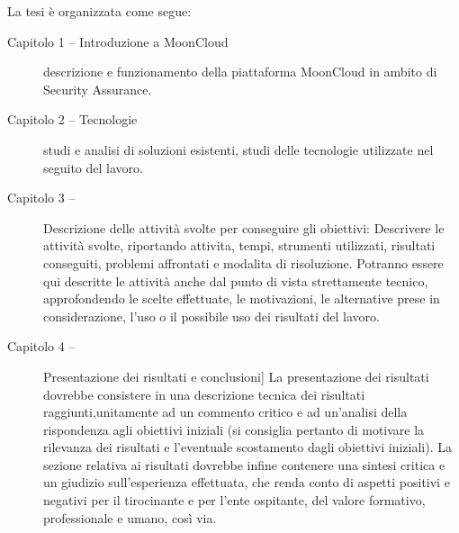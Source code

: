La tesi \`e organizzata come segue:
\begin{description}
    \item[Capitolo 1 -- Introduzione a MoonCloud] descrizione e funzionamento della piattaforma MoonCloud in ambito di Security Assurance. 
    \item[Capitolo 2 -- Tecnologie] studi e analisi di soluzioni esistenti, studi delle tecnologie utilizzate nel seguito del lavoro.
    \item[Capitolo 3 -- ] Descrizione delle attività svolte per conseguire gli obiettivi: Descrivere le attività svolte, 
    riportando attivita, tempi, strumenti utilizzati, risultati conseguiti, problemi affrontati e modalita di risoluzione. 
    Potranno essere qui descritte le attività anche dal punto di vista strettamente tecnico, approfondendo le scelte effettuate, 
    le motivazioni, le alternative prese in considerazione, l’uso o il possibile uso dei risultati del lavoro.
    \item[Capitolo 4 -- ] Presentazione dei risultati e conclusioni] La presentazione dei risultati dovrebbe consistere in una 
    descrizione tecnica dei risultati raggiunti,unitamente ad un commento critico e ad un’analisi della rispondenza agli 
    obiettivi iniziali (si consiglia pertanto di motivare 
    la rilevanza dei risultati e l’eventuale scostamento dagli obiettivi iniziali). La sezione relativa ai risultati dovrebbe 
    infine contenere una sintesi critica e un giudizio sull’esperienza effettuata, che renda conto di aspetti positivi e negativi
    per il tirocinante e per l’ente ospitante, del valore formativo, professionale e umano, così via.
\end{description}




